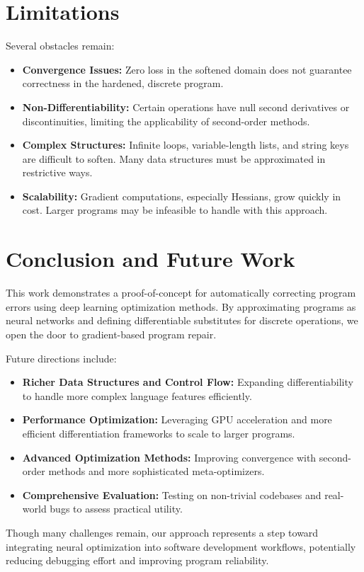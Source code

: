 \documentclass{article}
\begin{document}
\section{Limitations}
Several obstacles remain:
\begin{itemize}
    \item \textbf{Convergence Issues:} Zero loss in the softened domain does not guarantee correctness in the hardened, discrete program.
    \item \textbf{Non-Differentiability:} Certain operations have null second derivatives or discontinuities, limiting the applicability of second-order methods.
    \item \textbf{Complex Structures:} Infinite loops, variable-length lists, and string keys are difficult to soften. Many data structures must be approximated in restrictive ways.
    \item \textbf{Scalability:} Gradient computations, especially Hessians, grow quickly in cost. Larger programs may be infeasible to handle with this approach.
\end{itemize}

\section{Conclusion and Future Work}
This work demonstrates a proof-of-concept for automatically correcting program errors using deep learning optimization methods. By approximating programs as neural networks and defining differentiable substitutes for discrete operations, we open the door to gradient-based program repair.

Future directions include:
\begin{itemize}
    \item \textbf{Richer Data Structures and Control Flow:} Expanding differentiability to handle more complex language features efficiently.
    \item \textbf{Performance Optimization:} Leveraging GPU acceleration and more efficient differentiation frameworks to scale to larger programs.
    \item \textbf{Advanced Optimization Methods:} Improving convergence with second-order methods and more sophisticated meta-optimizers.
    \item \textbf{Comprehensive Evaluation:} Testing on non-trivial codebases and real-world bugs to assess practical utility.
\end{itemize}

Though many challenges remain, our approach represents a step toward integrating neural optimization into software development workflows, potentially reducing debugging effort and improving program reliability.



\end{document}
